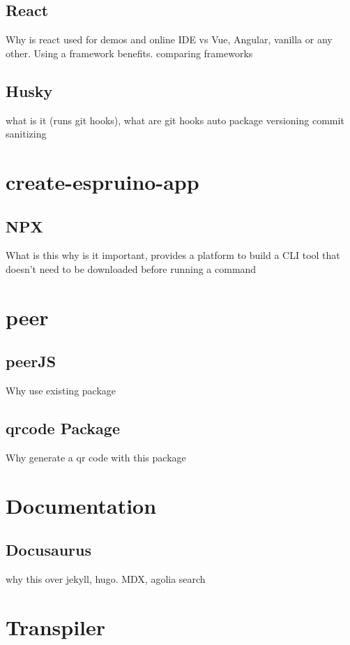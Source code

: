 \documentclass{l4proj}
\begin{document}
\subsection{React}
\text Why is react used for demos and online IDE vs Vue, Angular, vanilla or any other. Using a framework benefits.
comparing frameworks

\subsection{Husky}
\text what is it (runs git hooks), what are git hooks
auto package versioning
commit sanitizing

\section{create-espruino-app}

\subsection{NPX}
\text What is this why is it important, provides a platform to build a CLI tool that doesn’t need to be downloaded before running a command

\section{peer}

\subsection{peerJS}
\text Why use existing package
\subsection{qrcode Package}
\text Why generate a qr code with this package

\section{Documentation}

\subsection{Docusaurus}
\text why this over jekyll, hugo. MDX, agolia search

\section{Transpiler}
\end{document}
